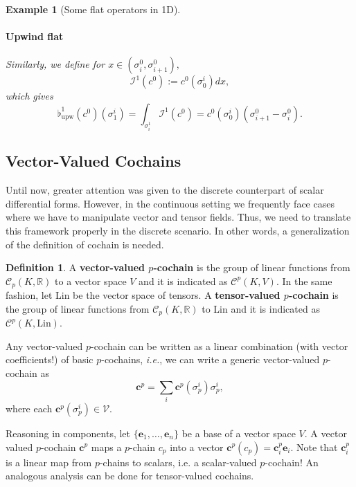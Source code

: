 \documentclass{article}
\theoremstyle{definition} %
\newtheorem{Def}{Definition}
\theoremstyle{plain} %
\newtheorem{Ex}[Th]{Example}
\theoremstyle{remark} %
\newcommand{\rr}{\mathbb{R}}
\newcommand{\ee}{\mathbf{e}}
\newcommand{\cc}{\mathbf{c}}
\begin{document}
\begin{Ex}[Some flat operators in 1D]
    \paragraph{Upwind flat} Similarly, we define for $ x \in (\sigma_{i}^0, \sigma_{i+1}^0),$
    \begin{equation}
        \mathcal{I}^1(c^0) := c^0(\sigma^{i}_0) dx,
    \end{equation}
    which gives
    \begin{equation}
        \flat^1_{\text{upw}}(c^0)(\sigma^i_1)= \int_{\sigma^1_i} \mathcal{I}^1(c^0) = c^0(\sigma^{i}_0)(\sigma_{i+1}^0 - \sigma_{i}^0).
    \end{equation}
\end{Ex}

\subsection{Vector-Valued Cochains}

Until now, greater attention was given to the discrete counterpart of scalar differential forms. However, in the continuous setting we frequently face cases where we have to manipulate vector and tensor fields. Thus, we need to translate this framework properly in the discrete scenario.
 In other words, a generalization of the definition of cochain is needed.

 \begin{Def}
        A \textbf{vector-valued $p$-cochain} is the group of linear functions from $\mathcal{C}_p(K, \rr)$ to a vector space $V$ and it is indicated as $\mathcal{C}^p(K, V)$. In the same fashion,  let Lin be the vector space of tensors. A \textbf{tensor-valued $p$-cochain} is the group of linear functions from $\mathcal{C}_p(K, \rr)$ to Lin and it is indicated as $\mathcal{C}^p(K, \text{Lin})$.
\end{Def}

Any vector-valued $p$-cochain can be written as a linear combination (with vector coefficients!) of basic $p$-cochains, \textsl{i.e.}, we can write a generic vector-valued $p$-cochain as
\begin{equation}
    \mathbf{c}^p = \sum_i \cc^p(\sigma_p^i)\sigma_p^i,
\end{equation}
where each $\cc^p(\sigma_p^i) \in \mathcal{V}$.

Reasoning in components, let $\{\ee_1, \dots, \ee_n\}$ be a base of a vector space $V$. A vector valued $p$-cochain $\cc^p$ maps a $p$-chain $c_p$ into a vector $\cc^p(c_p) = \cc^p_i \ee_i$. Note that $\cc^p_i$ is a linear map from $p$-chains to scalars, i.e. a scalar-valued $p$-cochain! 
An analogous analysis can be done for tensor-valued cochains.
\end{document}
